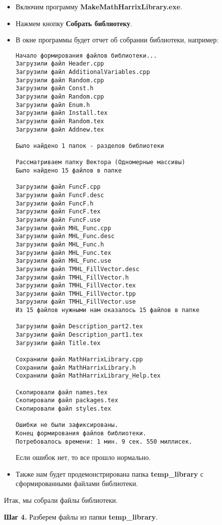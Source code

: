 \begin{itemize}
\item Включим программу \textbf{MakeMathHarrixLibrary.exe}.
\item Нажмем кнопку \textbf{Собрать библиотеку}.
\item В окне программы будет отчет об собрании библиотеки, например:
\begin{lstlisting}[label=examplereport, caption=Пример отчета о сборке библиотеки]
Начало формирования файлов библиотеки...
Загрузили файл Header.cpp
Загрузили файл AdditionalVariables.cpp
Загрузили файл Random.cpp
Загрузили файл Const.h
Загрузили файл Random.cpp
Загрузили файл Enum.h
Загрузили файл Install.tex
Загрузили файл Random.tex
Загрузили файл Addnew.tex

Было найдено 1 папок - разделов библиотеки

Рассматриваем папку Вектора (Одномерные массивы)
Было найдено 15 файлов в папке

Загрузили файл FuncF.cpp
Загрузили файл FuncF.desc
Загрузили файл FuncF.h
Загрузили файл FuncF.tex
Загрузили файл FuncF.use
Загрузили файл MHL_Func.cpp
Загрузили файл MHL_Func.desc
Загрузили файл MHL_Func.h
Загрузили файл MHL_Func.tex
Загрузили файл MHL_Func.use
Загрузили файл TMHL_FillVector.desc
Загрузили файл TMHL_FillVector.h
Загрузили файл TMHL_FillVector.tex
Загрузили файл TMHL_FillVector.tpp
Загрузили файл TMHL_FillVector.use
Из 15 файлов нужными нам оказалось 15 файлов в папке

Загрузили файл Description_part2.tex
Загрузили файл Description_part1.tex
Загрузили файл Title.tex

Сохранили файл MathHarrixLibrary.cpp
Сохранили файл MathHarrixLibrary.h
Сохранили файл MathHarrixLibrary_Help.tex

Скопировали файл names.tex
Скопировали файл packages.tex
Скопировали файл styles.tex

Ошибки не были зафиксированы.
Конец формирования файлов библиотеки.
Потребовалось времени: 1 мин. 9 сек. 550 миллисек.
\end{lstlisting}

Если ошибок нет, то все прошло нормально.
\item Также нам будет продемонстрирована папка \textbf{temp\_library} с сформированными файлами библиотеки.
\end{itemize}

Итак, мы собрали файлы библиотеки.

\textbf{Шаг 4.}\label{step4} Разберем файлы из папки \textbf{temp\_library}.


